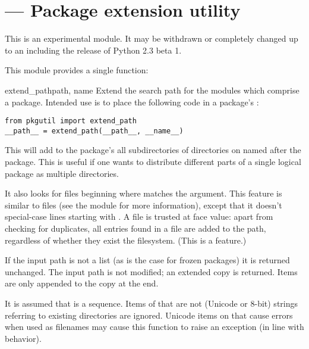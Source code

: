 \section{ ---
         Package extension utility}



\begin{notice}[warning]
  This is an experimental module.  It may be withdrawn or completely
  changed up to an including the release of Python 2.3 beta 1.
\end{notice}

This module provides a single function:

\begin{funcdesc}{extend_path}{path, name}
  Extend the search path for the modules which comprise a package.
  Intended use is to place the following code in a package's
  :

\begin{verbatim}
from pkgutil import extend_path
__path__ = extend_path(__path__, __name__)
\end{verbatim}

  This will add to the package's  all subdirectories of
  directories on  named after the package.  This is
  useful if one wants to distribute different parts of a single
  logical package as multiple directories.

  It also looks for  files beginning where \code{*}
  matches the  argument.  This feature is similar to
   files (see the  module for more
  information), except that it doesn't special-case lines starting
  with .  A  file is trusted at face value:
  apart from checking for duplicates, all entries found in a
   file are added to the path, regardless of whether they
  exist the filesystem.  (This is a feature.)

  If the input path is not a list (as is the case for frozen
  packages) it is returned unchanged.  The input path is not
  modified; an extended copy is returned.  Items are only appended
  to the copy at the end.

  It is assumed that  is a sequence.  Items of
   that are not (Unicode or 8-bit) strings referring to
  existing directories are ignored.  Unicode items on 
  that cause errors when used as filenames may cause this function to
  raise an exception (in line with  behavior).
\end{funcdesc}
